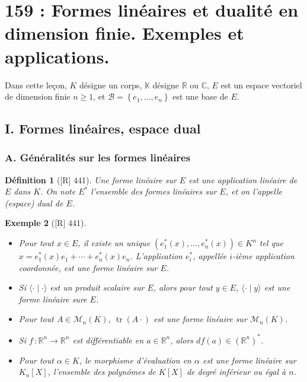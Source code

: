 \documentclass[10pt, a4paper, parskip=full, twoside, twocolumn]{report}
\newtheorem{definition}{Définition}
\newtheorem{example}[definition]{Exemple}
\newcommand{\IK}{\mathbb{K}}
\newcommand{\IC}{\mathbb{C}}
\newcommand{\IR}{\mathbb{R}}
\newcommand{\M}{\mathcal{M}}
\newcommand{\B}{\mathcal{B}}
\DeclareMathOperator{\tr}{tr}
\begin{document}
\chapter*{159 : Formes linéaires et dualité en dimension finie. Exemples et applications.}
\setcounter{definition}{0}

\textcolor{paragraphtext}{Dans cette leçon, $K$ désigne un corps, $\IK$ désigne $\IR$ ou $\IC$, $E$ est un espace vectoriel de dimension finie $n\geq 1$, et $\B=\left\{e_1,\dots, e_n\right\}$ est une base de $E$.}

\section*{I. Formes linéaires, espace dual}
\subsection*{A. Généralités sur les formes linéaires}

\begin{definition}[\textnormal{[R] 441}]
	Une \emph{forme linéaire sur $E$} est une application linéaire de $E$ dans $K$.
	On note $E^*$ l'ensemble des formes linéaires sur $E$, et on l'appelle \emph{(espace) dual de $E$}.
\end{definition}

\begin{example}[\textnormal{[R] 441}]
	\begin{itemize}
		\item Pour tout $x\in E$, il existe un unique $(e_1^*(x),\dots, e_n^*(x))\in K^n$ tel que $x = e_1^*(x)e_1 + \cdots + e_n^*(x)e_n$. L'application $e_i^*$, appellée \emph{$i$-ième application coordonnée}, est une forme linéaire sur $E$.
		\item Si $\langle\cdot\mid\cdot\rangle$ est un produit scalaire sur $E$, alors pour tout $y\in E$, $\langle\cdot \mid y\rangle$ est une forme linéaire sure $E$.
		\item Pour tout $A\in \M_n(K)$, $\tr(A\cdot)$ est une forme linéaire sur $\M_n(K)$.
		\item Si $f\,\colon \IR^n\to\IR^n$ est différentiable en $a\in\IR^n$, alors $df(a)\in\left(\IR^n\right)^*$.
		\item Pour tout $\alpha\in K$, le morphisme d'évaluation en $\alpha$ est une forme linéaire sur $K_n[X]$, l'ensemble des polynômes de $K[X]$ de degré inférieur ou égal à $n$.
	\end{itemize}
\end{example}
\end{document}
